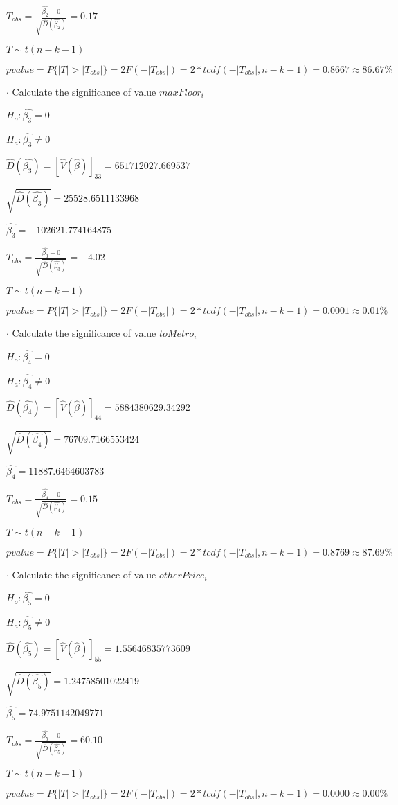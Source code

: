 \documentclass{article}
\begin{document}
$T_{obs}=\frac{\hat{\beta_2}-0}{\sqrt{\hat{D}(\hat{\beta_2})}}=0.17$

$T\sim t(n-k-1)$

$pvalue=P\{|T|>|T_{obs}|\}=2F(-|T_{obs}|)=2*tcdf(-|T_{obs}|, n-k-1)=0.8667\approx86.67\%$

$\cdot$ Calculate the significance of value $maxFloor_i$

$H_o: \hat{\beta_3}=0$

$H_a: \hat{\beta_3}\neq0$

$\hat{D}(\hat{\beta_3})=[\hat{V}(\hat{\beta})]_{3 3}=651712027.669537$

$\sqrt{\hat{D}(\hat{\beta_3})}=25528.6511133968$

$\hat{\beta_3}=-102621.774164875$

$T_{obs}=\frac{\hat{\beta_3}-0}{\sqrt{\hat{D}(\hat{\beta_3})}}=-4.02$

$T\sim t(n-k-1)$

$pvalue=P\{|T|>|T_{obs}|\}=2F(-|T_{obs}|)=2*tcdf(-|T_{obs}|, n-k-1)=0.0001\approx0.01\%$

$\cdot$ Calculate the significance of value $toMetro_i$

$H_o: \hat{\beta_4}=0$

$H_a: \hat{\beta_4}\neq0$

$\hat{D}(\hat{\beta_4})=[\hat{V}(\hat{\beta})]_{4 4}=5884380629.34292$

$\sqrt{\hat{D}(\hat{\beta_4})}=76709.7166553424$

$\hat{\beta_4}=11887.6464603783$

$T_{obs}=\frac{\hat{\beta_4}-0}{\sqrt{\hat{D}(\hat{\beta_4})}}=0.15$

$T\sim t(n-k-1)$

$pvalue=P\{|T|>|T_{obs}|\}=2F(-|T_{obs}|)=2*tcdf(-|T_{obs}|, n-k-1)=0.8769\approx87.69\%$

$\cdot$ Calculate the significance of value $otherPrice_i$

$H_o: \hat{\beta_5}=0$

$H_a: \hat{\beta_5}\neq0$

$\hat{D}(\hat{\beta_5})=[\hat{V}(\hat{\beta})]_{5 5}=1.55646835773609$

$\sqrt{\hat{D}(\hat{\beta_5})}=1.24758501022419$

$\hat{\beta_5}=74.9751142049771$

$T_{obs}=\frac{\hat{\beta_5}-0}{\sqrt{\hat{D}(\hat{\beta_5})}}=60.10$

$T\sim t(n-k-1)$

$pvalue=P\{|T|>|T_{obs}|\}=2F(-|T_{obs}|)=2*tcdf(-|T_{obs}|, n-k-1)=0.0000\approx0.00\%$
\end{document}
